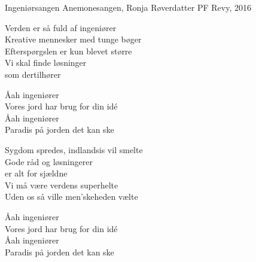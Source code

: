 \begin{song}{Ingeniørsangen}
  {} %
  {Anemonesangen, Ronja Røverdatter} %
  {} %
  {PF Revy, 2016} %
  {\NotCCLIed} %

  \begin{SBVerse}
    Verden er så fuld af ingeniører\\
    Kreative mennesker med tunge bøger\\
    Efterspørgslen er kun blevet større\\
    Vi skal finde løsninger\\
    som dertilhører
  \end{SBVerse}

  \begin{SBChorus}
    Åah ingeniører\\
    Vores jord har brug for din idé\\
    Åah ingeniører\\
    Paradis på jorden det kan ske
  \end{SBChorus}

  \begin{SBVerse}
    Sygdom spredes, indlandsis vil smelte\\
    Gode råd og løsningerer \\
    er alt for sjældne\\
    Vi må være verdens superhelte\\
    Uden os så ville men'skeheden vælte
  \end{SBVerse}

  \begin{SBChorus}
    Åah ingeniører\\
    Vores jord har brug for din idé\\
    Åah ingeniører\\
    Paradis på jorden det kan ske
  \end{SBChorus}

  \begin{SBSection*}
  \end{SBSection*}
\end{song}